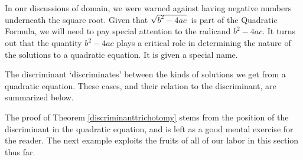 In our discussions of domain, we were warned against having negative numbers underneath the square root.  Given that $\sqrt{b^{2} - 4ac}$ is part of the Quadratic Formula, we will need to pay special attention to the radicand $b^{2} - 4ac$.  It turns out that the quantity $b^2-4ac$ plays a critical role in determining the nature of the solutions to a quadratic equation.  It is given a special name.

\smallskip


\medskip

The discriminant `discriminates' between the kinds of solutions we get from a quadratic equation.  These cases, and their relation to the discriminant, are summarized below.

\medskip


\smallskip

The proof of Theorem \ref{discriminanttrichotomy} stems from the position of the discriminant in the quadratic equation, and is left as a good mental exercise for the reader.  The next example exploits the fruits of all of our labor in this section thus far.

\medskip
 

